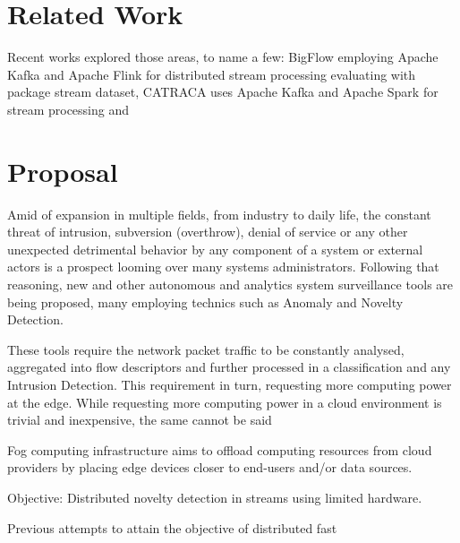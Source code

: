 \documentclass[conference]{IEEEtran}
\begin{document}
\section{Related Work}\label{sec:related}

Recent works explored those areas, to name a few: BigFlow \cite{Viegas2019}
employing Apache Kafka and Apache Flink for distributed stream processing
evaluating with package stream dataset,
CATRACA \cite{Lopez2018,AndreoniLopez2019a} uses 
Apache Kafka and Apache Spark for stream processing and 


\section{Proposal}\label{sec:prop}

Amid of \iot expansion in multiple fields, from industry to daily life,
the constant threat of intrusion, subversion (overthrow), denial of service
or any other unexpected detrimental behavior by any component of a system or
external actors is a prospect looming over many systems administrators.
Following that reasoning, new \nids and other autonomous and analytics system
surveillance tools are being proposed, many employing technics such as Anomaly
and Novelty Detection.

These tools require the network packet traffic to be constantly analysed,
aggregated into flow descriptors and further processed in a classification
and any Intrusion Detection.
This requirement in turn, requesting more computing power at the edge.
While requesting more computing power in a cloud environment is trivial and
inexpensive, the same cannot be said 

\begin{highlight}
Fog computing infrastructure aims to offload
computing resources from cloud providers by placing edge
devices closer to end-users and/or data sources.

Objective: Distributed novelty detection in streams using limited hardware.

Previous attempts to attain the objective of distributed fast
\end{highlight}
\end{document}
